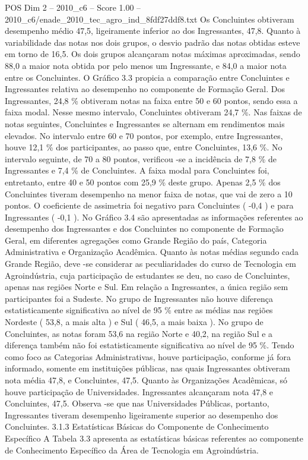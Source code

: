 \begin{textsample}{POS Dim 2 – 2010\_c6 – Score 1.00 – 2010\_c6/enade\_2010\_tec\_agro\_ind\_8fdf27ddf8.txt}
Os Concluintes obtiveram desempenho médio 47,5, ligeiramente inferior ao dos Ingressantes, 47,8.
Quanto à variabilidade das notas nos dois grupos, o desvio padrão das notas obtidas esteve em torno de 16,5.
Os dois grupos alcançaram notas máximas aproximadas, sendo 88,0 a maior nota obtida por pelo menos um Ingressante, e 84,0 a maior nota entre os Concluintes.
O Gráfico 3.3 propicia a comparação entre Concluintes e Ingressantes relativa ao desempenho no componente de Formação Geral.
Dos Ingressantes, 24,8 \% obtiveram notas na faixa entre 50 e 60 pontos, sendo essa a faixa modal.
Nesse mesmo intervalo, Concluintes obtiveram 24,7 \%.
Nas faixas de notas seguintes, Concluintes e Ingressantes se alternam em rendimentos mais elevados.
No intervalo entre 60 e 70 pontos, por exemplo, entre Ingressantes, houve 12,1 \% dos participantes, ao passo que, entre Concluintes, 13,6 \%.
No intervalo seguinte, de 70 a 80 pontos, verificou -se a incidência de 7,8 \% de Ingressantes e 7,4 \% de Concluintes.
A faixa modal para Concluintes foi, entretanto, entre 40 e 50 pontos com 25,9 \% deste grupo.
Apenas 2,5 \% dos Concluintes tiveram desempenho na menor faixa de notas, que vai de zero a 10 pontos.
O coeficiente de assimetria foi negativo para Concluintes ( -0,4 ) e para Ingressantes ( -0,1 ).
No Gráfico 3.4 são apresentadas as informações referentes ao desempenho dos Ingressantes e dos Concluintes no componente de Formação Geral, em diferentes agregações como Grande Região do país, Categoria Administrativa e Organização Acadêmica.
Quanto às notas médias segundo cada Grande Região, deve -se considerar as peculiaridades do curso de Tecnologia em Agroindústria, cuja participação de estudantes se deu, no caso de Concluintes, apenas nas regiões Norte e Sul.
Em relação a Ingressantes, a única região sem participantes foi a Sudeste.
No grupo de Ingressantes não houve diferença estatisticamente significativa ao nível de 95 \% entre as médias nas regiões Nordeste ( 53,8, a mais alta ) e Sul ( 46,5, a mais baixa ).
No grupo de Concluintes, as notas foram 53,6 na região Norte e 40,2, na região Sul e a diferença também não foi estatisticamente significativa ao nível de 95 \%.
Tendo como foco as Categorias Administrativas, houve participação, conforme já fora informado, somente em instituições públicas, nas quais Ingressantes obtiveram nota média 47,8, e Concluintes, 47,5.
Quanto às Organizações Acadêmicas, só houve participação de Universidades.
Ingressantes alcançaram nota 47,8 e Concluintes, 47,5.
Observa -se que nas Universidades Públicas, portanto, Ingressantes tiveram desempenho ligeiramente superior ao desempenho dos Concluintes. 3.1.3 Estatísticas Básicas do Componente de Conhecimento Específico A Tabela 3.3 apresenta as estatísticas básicas referentes ao componente de Conhecimento Específico da Área de Tecnologia em Agroindústria.

\end{textsample}
